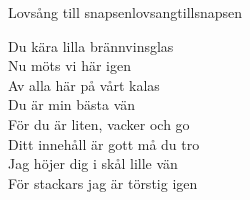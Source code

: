 \begin{song}{Lovsång till snapsen}{lovsangtillsnapsen}
\begin{vers}
Du kära lilla brännvinsglas\\
Nu möts vi här igen\\
Av alla här på vårt kalas\\
Du är min bästa vän\\
För du är liten, vacker och go\\
Ditt innehåll är gott må du tro\\
Jag höjer dig i skål lille vän\\
För stackars jag är törstig igen\\
\end{vers}
\end{song}
